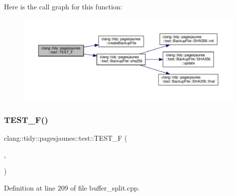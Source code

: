 Here is the call graph for this function\+:
\nopagebreak
\begin{figure}[H]
\begin{center}
\leavevmode
\includegraphics[width=350pt]{namespaceclang_1_1tidy_1_1pagesjaunes_1_1test_acbdee46e3e175a0551d9ce34f3fdf1db_cgraph}
\end{center}
\end{figure}
\mbox{\label{namespaceclang_1_1tidy_1_1pagesjaunes_1_1test_abdaff4f1b90a3db57f59ba18a26451a6}} 
\subsubsection{\texorpdfstring{T\+E\+S\+T\+\_\+\+F()}{TEST\_F()}\hspace{0.1cm}{\footnotesize\ttfamily [46/57]}}
{\footnotesize\ttfamily clang\+::tidy\+::pagesjaunes\+::test\+::\+T\+E\+S\+T\+\_\+F (\begin{DoxyParamCaption}\item[{\hyperlink{classclang_1_1tidy_1_1pagesjaunes_1_1test_1_1_buffer_split_test}{Buffer\+Split\+Test}}]{,  }\item[{Big\+Buffers2\+Start\+At0}]{ }\end{DoxyParamCaption})}



Definition at line 209 of file buffer\+\_\+split.\+cpp.

